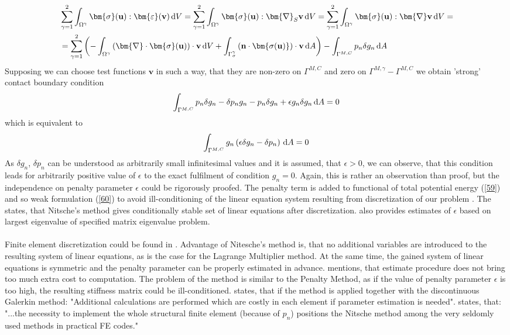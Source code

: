 \documentclass{article}
\newcommand{\beq}{\begin{equation}}
\newcommand{\eeq}{\end{equation}}
\newcommand{\bea}{\begin{eqnarray}}
\newcommand{\eea}{\end{eqnarray}}
\newcommand{\dd}{\,{\rm d}}
\begin{document}
\bea\label{62}
\begin{aligned}
&\sum^{2}_{\gamma = 1}\int_{\Omega^{\gamma}} \bm{\sigma}(\mathbf{u}) : \bm{\varepsilon}(\mathbf{v}) \dd V = \sum^{2}_{\gamma = 1}\int_{\Omega^{\gamma}} \bm{\sigma}(\mathbf{u}) : \bm{\nabla}_{S}\mathbf{v} \dd V =\sum^{2}_{\gamma = 1}\int_{\Omega^{\gamma}} \bm{\sigma}(\mathbf{u}) : \bm{\nabla}\mathbf{v} \dd V =
\\
&=\sum^{2}_{\gamma = 1}\left(-\int_{\Omega^{\gamma}}\left(\bm{\nabla}\cdot\bm{\sigma}(\mathbf{u})\right) \cdot \mathbf{v} \dd V + \int_{\Gamma^{\gamma}_{\sigma}} \left(\mathbf{n}\cdot\bm{\sigma(\mathbf{u})} \right)\cdot\mathbf{v}\dd A\right)-\int_{\Gamma^{M,C}} p_{n} \delta g_{n} \dd A
\end{aligned}
\eea 
Supposing we can choose test functions $\mathbf{v}$ in such a way, that they are non-zero on $ \Gamma^{M,C} $ and zero on $ \Gamma^{M,\gamma}-\Gamma^{M,C} $ we obtain 'strong' contact boundary condition
\beq\label{63}
\int_{\Gamma^{M,C}} p_{n} \delta g_{n} -\delta p_{n} g_{n}- p_{n} \delta g_{n}+\epsilon g_{n} \delta g_{n} \dd A = 0
\eeq
which is equivalent to   
\beq\label{64}
\int_{\Gamma^{M,C}} g_{n}\left(\epsilon  \delta g_{n}-\delta p_{n}\right) \dd A = 0
\eeq 
As $ \delta g_{n} $, $ \delta p_{n} $ can be understood as arbitrarily small infinitesimal values and it is assumed, that $\epsilon > 0$, we can observe, that this condition leads for arbitrarily positive value of $ \epsilon $ to the exact fulfilment of condition $ g_{n} = 0 $. Again, this is rather an observation than proof, but the independence on penalty parameter $\epsilon $ could be rigorously proofed. The penalty term is added to functional of total potential energy  (\ref{59}) and so weak formulation (\ref{60}) to avoid ill-conditioning of the linear equation system resulting from discretization of our problem \cite[Chapter 5, p.106]{Wriggers}. The \cite{Augarde} states, that Nitsche's method gives conditionally stable set of linear equations after discretization. \cite{Augarde} also provides estimates of $\epsilon $ based on largest eigenvalue of specified matrix eigenvalue problem. 
\\
\\
Finite element discretization could be found in \cite[Chapter 7, p.194-198]{Wriggers}. Advantage of Nitesche's method is, that no additional variables are introduced to the resulting system of linear equations, as is the case for the Lagrange Multiplier method. At the same time, the gained system of linear equations is symmetric and the penalty parameter can be properly estimated in advance. \cite{Augarde} mentions, that estimate procedure does not bring too much extra cost to computation. The problem of the method is similar to the Penalty Method, as if the value of penalty parameter $\epsilon$ is too high, the resulting stiffness matrix could be ill-conditioned. \cite{Augarde} states, that if the method is applied together with the discontinuous Galerkin method: "Additional calculations are performed which are costly in each element if parameter estimation is needed". \cite[Chapter 6, p.83]{Izi} states, that: "...the necessity to implement the whole structural finite element (because of $p_{n}$) positions the Nitsche method among the very seldomly used methods in practical FE codes."  
\end{document}
